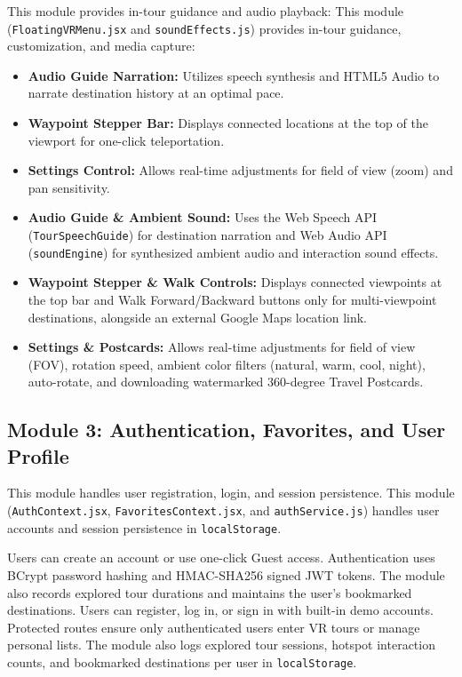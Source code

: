 \documentclass{tietreport}
\begin{document}
This module provides in-tour guidance and audio playback:
This module (\texttt{FloatingVRMenu.jsx} and \texttt{soundEffects.js}) provides in-tour guidance, customization, and media capture:
\begin{itemize}
  \item \textbf{Audio Guide Narration:} Utilizes speech synthesis and HTML5 Audio to narrate destination history at an optimal pace.
  \item \textbf{Waypoint Stepper Bar:} Displays connected locations at the top of the viewport for one-click teleportation.
  \item \textbf{Settings Control:} Allows real-time adjustments for field of view (zoom) and pan sensitivity.
  \item \textbf{Audio Guide \& Ambient Sound:} Uses the Web Speech API (\texttt{TourSpeechGuide}) for destination narration and Web Audio API (\texttt{soundEngine}) for synthesized ambient audio and interaction sound effects.
  \item \textbf{Waypoint Stepper \& Walk Controls:} Displays connected viewpoints at the top bar and Walk Forward/Backward buttons only for multi-viewpoint destinations, alongside an external Google Maps location link.
  \item \textbf{Settings \& Postcards:} Allows real-time adjustments for field of view (FOV), rotation speed, ambient color filters (natural, warm, cool, night), auto-rotate, and downloading watermarked 360-degree Travel Postcards.
\end{itemize}

\subsection{Module 3: Authentication, Favorites, and User Profile}

This module handles user registration, login, and session persistence.
This module (\texttt{AuthContext.jsx}, \texttt{FavoritesContext.jsx}, and \texttt{authService.js}) handles user accounts and session persistence in \texttt{localStorage}.

Users can create an account or use one-click Guest access. Authentication uses BCrypt password hashing and HMAC-SHA256 signed JWT tokens. The module also records explored tour durations and maintains the user's bookmarked destinations.
Users can register, log in, or sign in with built-in demo accounts. Protected routes ensure only authenticated users enter VR tours or manage personal lists. The module also logs explored tour sessions, hotspot interaction counts, and bookmarked destinations per user in \texttt{localStorage}.
\end{document}
